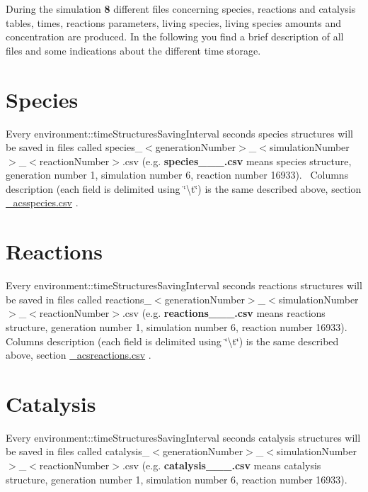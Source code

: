 During the simulation {\bfseries 8} different files concerning species, reactions and catalysis tables, times, reactions parameters, living species, living species amounts and concentration are produced. In the following you find a brief description of all files and some indications about the different time storage. \hypertarget{a00006_outspecies}{}\section{Species}\label{a00006_outspecies}
Every environment\+::time\+Structures\+Saving\+Interval seconds species structures will be saved in files called species\+\_\+$<$generation\+Number$>$\+\_\+$<$simulation\+Number$>$\+\_\+$<$reaction\+Number$>$.\+csv (e.\+g. {\bfseries species\+\_\+\_\+\_.\+csv} means species structure, generation number 1, simulation number 6, reaction number 16933).~\newline
Columns description (each field is delimited using \char`\"{}\textbackslash{}t\char`\"{}) is the same described above, section \hyperlink{a00004_subSpecies}{\+\_\+acsspecies.\+csv} .\hypertarget{a00006_outreactions}{}\section{Reactions}\label{a00006_outreactions}
Every environment\+::time\+Structures\+Saving\+Interval seconds reactions structures will be saved in files called reactions\+\_\+$<$generation\+Number$>$\+\_\+$<$simulation\+Number$>$\+\_\+$<$reaction\+Number$>$.\+csv (e.\+g. {\bfseries reactions\+\_\+\_\+\_.\+csv} means reactions structure, generation number 1, simulation number 6, reaction number 16933). ~\newline
Columns description (each field is delimited using \char`\"{}\textbackslash{}t\char`\"{}) is the same described above, section \hyperlink{a00004_subReactions}{\+\_\+acsreactions.\+csv} .\hypertarget{a00006_outcatalysis}{}\section{Catalysis}\label{a00006_outcatalysis}
Every environment\+::time\+Structures\+Saving\+Interval seconds catalysis structures will be saved in files called catalysis\+\_\+$<$generation\+Number$>$\+\_\+$<$simulation\+Number$>$\+\_\+$<$reaction\+Number$>$.\+csv (e.\+g. {\bfseries catalysis\+\_\+\_\+\_.\+csv} means catalysis structure, generation number 1, simulation number 6, reaction number 16933). ~\newline
